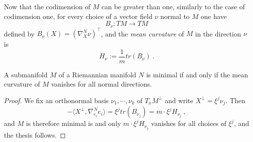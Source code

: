 Now that the codimension of $M$ can be greater than one, similarly to the case of codimension one, for every choice of a vector field $\nu$ normal to $M$ one have
\[
    B_\nu : TM \to TM
\]
defined by $B_\nu(X) = (\nabla^N_X \nu)^\top$, and the \textit{mean curvature} of $M$ in the direction $\nu$ is
\[
    H_\nu := \frac{1}{m} tr(B_\nu) \ .
\]
\begin{theorem}
    A submanifold $M$ of a Riemannian manifold $N$ is minimal if and only if the mean curvature of $M$ vanishes for all normal directions.
\end{theorem}
\begin{proof}
    We fix an orthonormal basis $\nu_1 , \cdots, \nu_k$ of $T_x M^\perp$ and write $X^\perp = \xi^j \nu_j$.
    Then
    \[
        -\langle X^\perp , \nabla^N_{e_i} e_i \rangle = \xi^j tr(B_{\nu_j}) = m \cdot \xi^j H_{\nu_j} \ ,
    \]
    and $M$ is therefore minimal is and only $m \cdot \xi^j H_{\nu_j}$ vanishes for all choices of $\xi^j$, and the thesis follows.
\end{proof}

